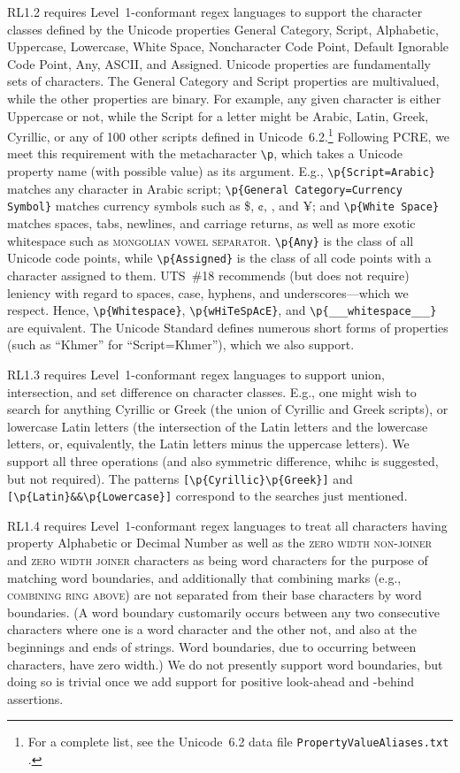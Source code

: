 \documentclass[5p,final,number,sort&compress]{elsarticle}
\newcommand{\re}[1]{\texttt{#1}}
\newcommand*{\whack}{\textbackslash}
\begin{document}
RL1.2 requires Level~1-conformant regex languages to support the character classes defined by the Unicode properties General Category, Script, Alphabetic, Uppercase, Lowercase, White Space, Noncharacter Code Point, Default Ignorable Code Point, Any, ASCII, and Assigned. Unicode properties are fundamentally sets of characters. The General Category and Script properties are multivalued, while the other properties are binary. For example, any given character is either Uppercase or not, while the Script for a letter might be Arabic, Latin, Greek, Cyrillic, or any of 100 other scripts defined in Unicode~6.2.\footnote{For a complete list, see the Unicode~6.2 data file \texttt{PropertyValueAliases.txt} \citep{ustd62}.} Following PCRE, we meet this requirement with the metacharacter \re{\whack p}, which takes a Unicode property name (with possible value) as its argument. E.g., \re{\whack p\{Script=Arabic\}} matches any character in Arabic script; \re{\whack p\{General Category=Currency Symbol\}} matches currency symbols such as \$, ¢, \texteuro, and ¥; and \re{\whack p\{White Space\}} matches spaces, tabs, newlines, and carriage returns, as well as more exotic whitespace such as \textsc{mongolian vowel separator}.  \re{\whack p\{Any\}} is the class of all Unicode code points, while \re{\whack p\{Assigned\}} is the class of all code points with a character assigned to them. UTS~\#18 recommends (but does not require) leniency with regard to spaces, case, hyphens, and underscores---which we respect. Hence, \re{\whack p\{Whitespace\}}, \re{\whack p\{wHiTeSpAcE\}}, and \re{\whack p\{\_\_\_white\;\;\;\;space\_\_\_\}} are equivalent. The Unicode Standard defines numerous short forms of properties (such as ``Khmer'' for ``Script=Khmer''), which we also support.

RL1.3 requires Level~1-conformant regex languages to support union, intersection, and set difference on character classes. E.g., one might wish to search for anything Cyrillic or Greek (the union of Cyrillic and Greek scripts), or lowercase Latin letters (the intersection of the Latin letters and the lowercase letters, or, equivalently, the Latin letters minus the uppercase letters). We support all three operations (and also symmetric difference, whihc is suggested, but not required). The patterns \re{[\whack p\{Cyrillic\}\whack p\{Greek\}]} and \re{[\whack p\{Latin\}\&\&\whack p\{Lowercase\}]} correspond to the searches just mentioned.

RL1.4 requires Level~1-conformant regex languages to treat all characters having property Alphabetic or Decimal Number as well as the \textsc{zero width non-joiner} and \textsc{zero width joiner} characters as being word characters for the purpose of matching word boundaries, and additionally that combining marks (e.g., \textsc{combining ring above}) are not separated from their base characters by word boundaries. (A word boundary customarily occurs between any two consecutive characters where one is a word character and the other not, and also at the beginnings and ends of strings. Word boundaries, due to occurring between characters, have zero width.) We do not presently support word boundaries, but doing so is trivial once we add support for positive look-ahead and -behind assertions.
\end{document}
